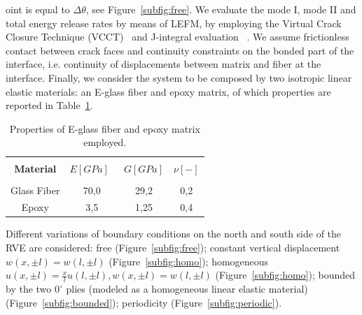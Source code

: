 \documentclass[a4paper]{jpconf}
\begin{document}
oint is equal to $\Delta\theta$, see Figure~\ref{subfig:free}. We evaluate the mode I, mode II and total energy release rates by means of LEFM, by employing the Virtual Crack Closure Technique (VCCT)~\cite{Krueger:2004,abaqus:2016} and J-integral evaluation ~\cite{Rice:1968,abaqus:2016}. We assume frictionless contact between crack faces and continuity constraints on the bonded part of the interface, i.e. continuity of displacements between matrix and fiber at the interface. Finally, we consider the system to be composed by two isotropic linear elastic materials: an E-glass fiber and epoxy matrix, of which properties are reported in Table~\ref{tab:phaseprop}.
\begin{table}[H]
  \centering
  \caption{Properties of E-glass fiber and epoxy matrix employed.}
    \begin{tabular}{cccc}
&&&\\
    \textbf{Material} & \textbf{$E\left[GPa\right]$}\ & \textbf{$G\left[GPa\right]$} & \textbf{$\nu\left[-\right]$} \\[3pt]
    \midrule\\[12pt]
    Glass Fiber    & 70,0  & 29,2   & 0,2  \\[16pt]
    Epoxy    & 3,5    & 1,25   & 0,4

    \end{tabular}%
  \label{tab:phaseprop}%
\end{table}%
Different variations of boundary conditions on the north and south side of the RVE are considered: free (Figure~\ref{subfig:free}); constant vertical displacement $w\left(x,\pm l\right)=w\left(l,\pm l\right)$ (Figure~\ref{subfig:homo}); homogeneous $u\left(x,\pm l\right)=\frac{x}{l}u\left(l,\pm l\right),w\left(x,\pm l\right)=w\left(l,\pm l\right)$ (Figure~\ref{subfig:homo}); bounded by the two $0^{\circ}$ plies (modeled as a homogeneous linear elastic material) (Figure~\ref{subfig:bounded}); periodicity (Figure~\ref{subfig:periodic}).
\end{document}
